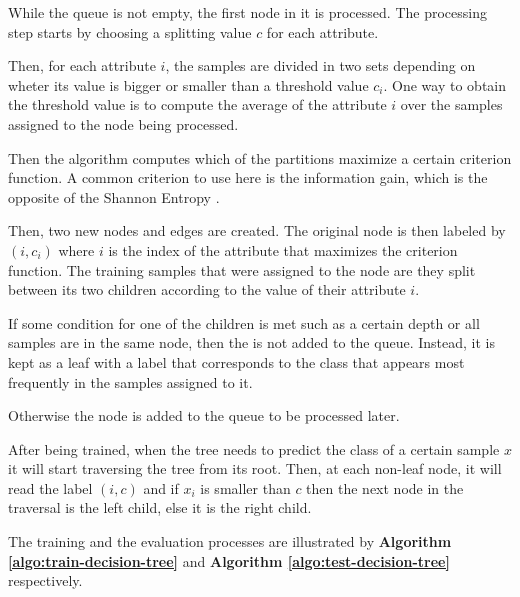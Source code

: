 While the queue is not empty, the first node in it is processed.
The processing step starts by choosing a splitting value $c$ for each attribute.

Then, for each attribute $i$, the samples are divided in two sets depending on wheter its value is bigger or smaller than a threshold value $c_i$.
One way to obtain the threshold value is to compute the average of the attribute $i$ over the samples assigned to the node being processed.

Then the algorithm computes which of the partitions maximize a certain criterion function.
A common criterion to use here is the information gain, which is the opposite of the Shannon Entropy \cite{shannon1948mathematical}.

Then, two new nodes and edges are created.
The original node is then labeled by $(i, c_i)$ where $i$ is the index of the attribute that maximizes the criterion function.
The training samples that were assigned to the node are they split between its two children according to the value of their attribute $i$.

If some condition for one of the children is met such as a certain depth or all samples are in the same node, then the is not added to the queue.
Instead, it is kept as a leaf with a label that corresponds to the class that appears most frequently in the samples assigned to it.

Otherwise the node is added to the queue to be processed later.

After being trained, when the tree needs to predict the class of a certain sample $x$ it will start traversing the tree from its root. 
Then, at each non-leaf node, it will read the label $(i, c)$ and if $x_i$ is smaller than $c$ then the next node in the traversal is the left child, else it is the right child.

The training and the evaluation processes are illustrated by \textbf{Algorithm \ref{algo:train-decision-tree}} and \textbf{Algorithm \ref{algo:test-decision-tree}} respectively.

